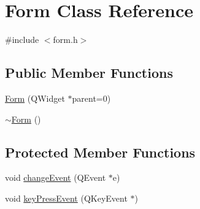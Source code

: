 \hypertarget{class_form}{
\section{Form Class Reference}
\label{class_form}
}


{\ttfamily \#include $<$form.h$>$}\subsection*{Public Member Functions}
\begin{DoxyCompactItemize}
\item 
\hyperlink{class_form_a9a921e26a02f23bffdea4330d6795796}{Form} (QWidget $\ast$parent=0)
\item 
\hyperlink{class_form_a9cda7cce41e81bfaca51e922d4f9b98f}{$\sim$Form} ()
\end{DoxyCompactItemize}
\subsection*{Protected Member Functions}
\begin{DoxyCompactItemize}
\item 
void \hyperlink{class_form_a633009d9f1f6700717dccc3e11cb38d9}{changeEvent} (QEvent $\ast$e)
\item 
void \hyperlink{class_form_a51af7e40b48b232f7b3a61f2242aa205}{keyPressEvent} (QKeyEvent $\ast$)
\end{DoxyCompactItemize}
